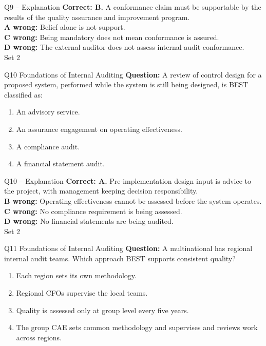 \documentclass[aspectratio=169,10pt]{beamer}
\begin{document}
\begin{frame}[t]{Q9 -- Explanation}
	\footnotesize
	\textbf{Correct: B.} A conformance claim must be supportable by the results of the quality assurance and improvement program. \\[5pt]
\textbf{A wrong:} Belief alone is not support. \\[3pt]
\textbf{C wrong:} Being mandatory does not mean conformance is assured. \\[3pt]
\textbf{D wrong:} The external auditor does not assess internal audit conformance. \\[3pt]
	\vfill {\tiny Set 2}
\end{frame}

\begin{frame}[t]{Q10 \hfill {\scriptsize Foundations of Internal Auditing}}
	\small
	\textbf{Question:} A review of control design for a proposed system, performed while the system is still being designed, is BEST classified as:
	\begin{enumerate}[label=\Alph*.,itemsep=1pt,topsep=3pt]
			\item An advisory service.
			\item An assurance engagement on operating effectiveness.
			\item A compliance audit.
			\item A financial statement audit.
	\end{enumerate}
\end{frame}

\begin{frame}[t]{Q10 -- Explanation}
	\footnotesize
	\textbf{Correct: A.} Pre-implementation design input is advice to the project, with management keeping decision responsibility. \\[5pt]
\textbf{B wrong:} Operating effectiveness cannot be assessed before the system operates. \\[3pt]
\textbf{C wrong:} No compliance requirement is being assessed. \\[3pt]
\textbf{D wrong:} No financial statements are being audited. \\[3pt]
	\vfill {\tiny Set 2}
\end{frame}

\begin{frame}[t]{Q11 \hfill {\scriptsize Foundations of Internal Auditing}}
	\small
	\textbf{Question:} A multinational has regional internal audit teams. Which approach BEST supports consistent quality?
	\begin{enumerate}[label=\Alph*.,itemsep=1pt,topsep=3pt]
			\item Each region sets its own methodology.
			\item Regional CFOs supervise the local teams.
			\item Quality is assessed only at group level every five years.
			\item The group CAE sets common methodology and supervises and reviews work across regions.
	\end{enumerate}
\end{frame}
\end{document}
